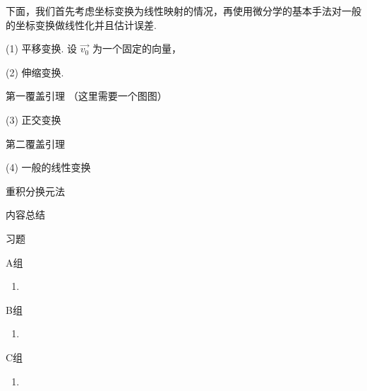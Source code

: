 下面，我们首先考虑坐标变换为线性映射的情况，再使用微分学的基本手法对一般的坐标变换做线性化并且估计误差.

(1) 平移变换. 设 $\vec{v_0}$ 为一个固定的向量，

(2) 伸缩变换.

\begin{lemma}{第一覆盖引理}{}
    （这里需要一个图图）

\end{lemma}

\begin{theorem}{}{}

\end{theorem}

(3) 正交变换

\begin{lemma}{第二覆盖引理}{}

\end{lemma}

\begin{theorem}{}{}

\end{theorem}

(4) 一般的线性变换

\begin{theorem}{}{}

\end{theorem}


\begin{lemma}{}{}

\end{lemma}

\begin{lemma}{}{}

\end{lemma}

\begin{lemma}{}{}

\end{lemma}

\begin{theorem}{重积分换元法}{}

\end{theorem}

\vspace{2ex}
\centerline{\heiti \Large 内容总结}

\vspace{2ex}
\centerline{\heiti \Large 习题}

\vspace{2ex}
{\kaishu }
\begin{flushright}
    \kaishu

\end{flushright}

\centerline{\heiti A组}
\begin{enumerate}
    \item
\end{enumerate}

\centerline{\heiti B组}
\begin{enumerate}
    \item
\end{enumerate}

\centerline{\heiti C组}
\begin{enumerate}
    \item
\end{enumerate}

